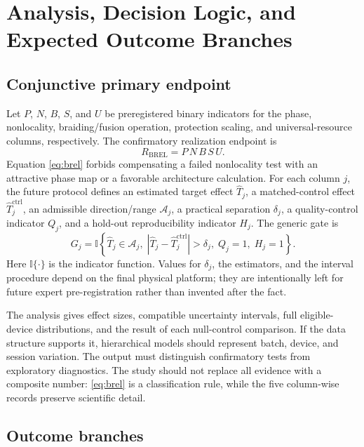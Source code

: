 \documentclass[conference]{IEEEtran}
\begin{document}
\section{Analysis, Decision Logic, and Expected Outcome Branches}

\subsection{Conjunctive primary endpoint}

Let $P$, $N$, $B$, $S$, and $U$ be preregistered binary indicators for the phase, nonlocality, braiding/fusion operation, protection scaling, and universal-resource columns, respectively. The confirmatory realization endpoint is
\begin{equation}
R_{\mathrm{BREL}}=P\,N\,B\,S\,U.
\label{eq:brel}
\end{equation}
Equation \eqref{eq:brel} forbids compensating a failed nonlocality test with an attractive phase map or a favorable architecture calculation. For each column $j$, the future protocol defines an estimated target effect $\widehat{T}_j$, a matched-control effect $\widehat{T}^{\mathrm{ctrl}}_j$, an admissible direction/range $\mathcal{A}_j$, a practical separation $\delta_j$, a quality-control indicator $Q_j$, and a hold-out reproducibility indicator $H_j$. The generic gate is
\begin{equation}
G_j=\mathbb{I}\left\{\widehat{T}_j\in\mathcal{A}_j,\;\left|\widehat{T}_j-\widehat{T}^{\mathrm{ctrl}}_j\right|>\delta_j,\;Q_j=1,\;H_j=1\right\}.
\label{eq:gate}
\end{equation}
Here $\mathbb{I}\{\cdot\}$ is the indicator function. Values for $\delta_j$, the estimators, and the interval procedure depend on the final physical platform; they are intentionally left for future expert pre-registration rather than invented after the fact.

The analysis gives effect sizes, compatible uncertainty intervals, full eligible-device distributions, and the result of each null-control comparison. If the data structure supports it, hierarchical models should represent batch, device, and session variation. The output must distinguish confirmatory tests from exploratory diagnostics. The study should not replace all evidence with a composite number: \eqref{eq:brel} is a classification rule, while the five column-wise records preserve scientific detail.

\subsection{Outcome branches}
\end{document}
